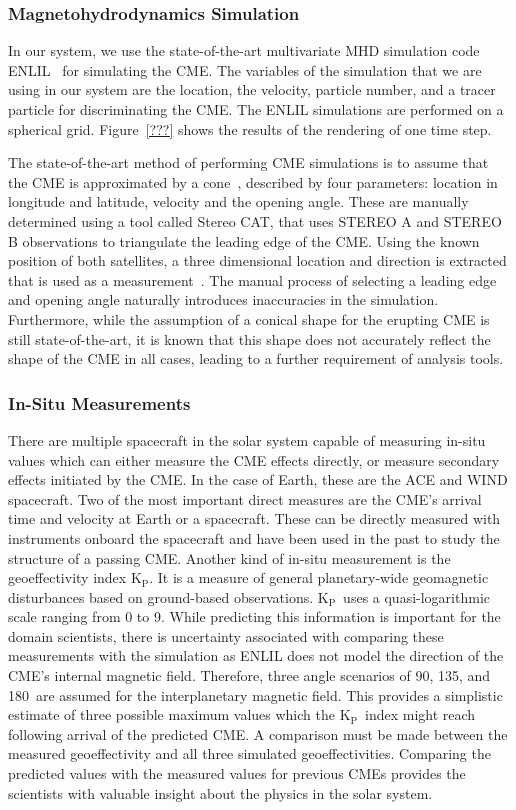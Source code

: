 \documentclass[journal]{vgtc}                %
\newcommand{\kpIndex}{$\textrm{K}_\textrm{P}$}
\begin{document}
\subsubsection{Magnetohydrodynamics Simulation} \label{sec:mhd}
In our system, we use the state-of-the-art multivariate MHD simulation code ENLIL~\cite{odstrcil2002merging} for simulating the CME. The variables of the simulation that we are using in our system are the location, the velocity, particle number, and a tracer particle for discriminating the CME. The ENLIL simulations are performed on a spherical grid. Figure~\ref{???} shows the results of the rendering of one time step.

The state-of-the-art method of performing CME simulations is to assume that the CME is approximated by a cone~\cite{Arge:2000jz}, described by four parameters: location in longitude and latitude, velocity and the opening angle. These are manually determined using a tool called Stereo CAT, that uses STEREO A and STEREO B observations to triangulate the leading edge of the CME. Using the known position of both satellites, a three dimensional location and direction is extracted that is used as a measurement~\cite{Millward:2013cm}. The manual process of selecting a leading edge and opening angle naturally introduces inaccuracies in the simulation. Furthermore, while the assumption of a conical shape for the erupting CME is still state-of-the-art, it is known that this shape does not accurately reflect the shape of the CME in all cases, leading to a further requirement of analysis tools.

\subsubsection{In-Situ Measurements} \label{sec:insitu}
There are multiple spacecraft in the solar system capable of measuring in-situ values which can either measure the CME effects directly, or measure secondary effects initiated by the CME. In the case of Earth, these are the ACE and WIND spacecraft. Two of the most important direct measures are the CME's arrival time and velocity at Earth or a spacecraft. These can be directly measured with instruments onboard the spacecraft and have been used in the past to study the structure of a passing CME. Another kind of in-situ measurement is the geoeffectivity index \kpIndex. It is a measure of general planetary-wide geomagnetic disturbances based on ground-based observations. \kpIndex\ uses a quasi-logarithmic scale ranging from 0 to 9. While predicting this information is important for the domain scientists, there is uncertainty associated with comparing these measurements with the simulation as ENLIL does not model the direction of the CME's internal magnetic field. Therefore, three angle scenarios of 90\degree , 135\degree , and 180\degree\ are assumed for the interplanetary magnetic field. This provides a simplistic estimate of three possible maximum values which the \kpIndex\ index might reach following arrival of the predicted CME. A comparison must be made between the measured geoeffectivity and all three simulated geoeffectivities. Comparing the predicted values with the measured values for previous CMEs provides the scientists with valuable insight about the physics in the solar system. 
\end{document}
